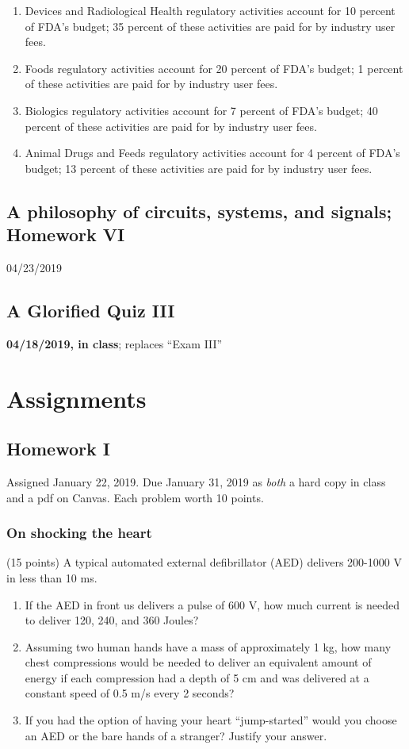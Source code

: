 \documentclass[11pt]{book}
\begin{document}
\begin{enumerate}
	\item Devices and Radiological Health regulatory activities account for 10 percent of FDA’s budget; 35 percent of these activities are paid for by industry user fees.
	\item Foods regulatory activities account for 20 percent of FDA’s budget; 1 percent of these activities are paid for by industry user fees.
	\item Biologics regulatory activities account for 7 percent of FDA’s budget; 40 percent of these activities are paid for by industry user fees.
	\item Animal Drugs and Feeds regulatory activities account for 4 percent of FDA’s budget; 13 percent of these activities are paid for by industry user fees.
\end{enumerate}




\chapter{A philosophy of circuits, systems, and signals; Homework VI}
04/23/2019



\chapter*{A Glorified Quiz III}
\textbf{04/18/2019, in class}; replaces ``Exam III''


\part{Assignments}
\chapter*{Homework I}
Assigned January 22, 2019. Due January 31, 2019 as \textit{both} a hard copy in class and a pdf on Canvas. Each problem worth 10 points.
\setcounter{chapter}{1}
\setcounter{section}{0}
\section{On shocking the heart}
(15 points)	A typical automated external defibrillator (AED) delivers 200-1000 V in less than 10 ms. 
\begin{enumerate}
	\item If the AED in front us delivers a pulse of 600 V, how much current is needed to deliver 120, 240, and 360 Joules?
	\item Assuming two human hands have a mass of approximately 1 kg, how many chest compressions would be needed to deliver an equivalent amount of energy if each compression had a depth of 5 cm and was delivered at a constant speed of 0.5 m/s every 2 seconds?
	\item If you had the option of having your heart “jump-started” would you choose an AED or the bare hands of a stranger? Justify your answer.
\end{enumerate}
\end{document}
